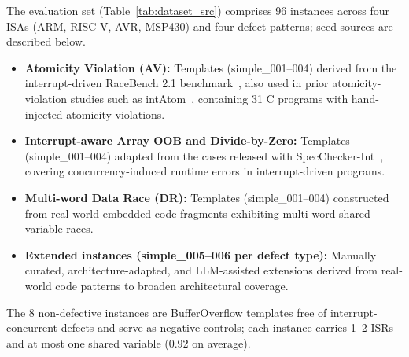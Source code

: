 \documentclass[a4paper,UKenglish,cleveref, autoref, thm-restate]{lipics-v2021}
\begin{document}
The evaluation set (Table~\ref{tab:dataset_src}) comprises 96 instances across four ISAs (ARM, RISC-V, AVR, MSP430) and four defect patterns; seed sources are described below.

\begin{itemize}
  \item \textbf{Atomicity Violation (AV):} Templates (simple\_001--004) derived from the interrupt-driven RaceBench 2.1 benchmark~\cite{racebench2021repo}, also used in prior atomicity-violation studies such as intAtom~\cite{li2022precise}, containing 31 C programs with hand-injected atomicity violations.
  \item \textbf{Interrupt-aware Array OOB and Divide-by-Zero:} Templates (simple\_001--004) adapted from the cases released with SpecChecker-Int~\cite{wang2025specchecker}, covering concurrency-induced runtime errors in interrupt-driven programs.
  \item \textbf{Multi-word Data Race (DR):} Templates (simple\_001--004) constructed from real-world embedded code fragments exhibiting multi-word shared-variable races.
  \item \textbf{Extended instances (simple\_005--006 per defect type):} Manually curated, architecture-adapted, and LLM-assisted extensions derived from real-world code patterns to broaden architectural coverage.
\end{itemize}

The 8 non-defective instances are BufferOverflow templates free of interrupt-concurrent defects and serve as negative controls; each instance carries 1--2 ISRs and at most one shared variable (0.92 on average).
\end{document}
